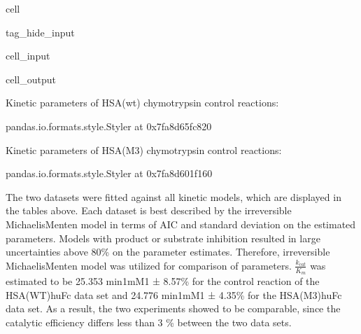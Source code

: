 \documentclass[letterpaper,12pt,english]{jupyterBook}
\begin{document}
\begin{sphinxuseclass}{cell}
\begin{sphinxuseclass}{tag_hide_input}
\begin{sphinxVerbatimInput}
\begin{sphinxuseclass}{cell_input}
\end{sphinxuseclass}\end{sphinxVerbatimInput}
\begin{sphinxVerbatimOutput}

\begin{sphinxuseclass}{cell_output}
\begin{sphinxVerbatim}[commandchars=\\\{\}]
Kinetic parameters of HSA(wt) chymotrypsin control reactions:
\end{sphinxVerbatim}

\begin{sphinxVerbatim}[commandchars=\\\{\}]
\PYGZlt{}pandas.io.formats.style.Styler at 0x7fa8d65fc820\PYGZgt{}
\end{sphinxVerbatim}

\begin{sphinxVerbatim}[commandchars=\\\{\}]
Kinetic parameters of HSA(M3) chymotrypsin control reactions:
\end{sphinxVerbatim}

\begin{sphinxVerbatim}[commandchars=\\\{\}]
\PYGZlt{}pandas.io.formats.style.Styler at 0x7fa8d601f160\PYGZgt{}
\end{sphinxVerbatim}

\noindent{}

\end{sphinxuseclass}\end{sphinxVerbatimOutput}

\end{sphinxuseclass}
\end{sphinxuseclass}
\sphinxAtStartPar
{}

\sphinxAtStartPar
The two datasets were fitted against all kinetic models, which are displayed in the tables above.
Each dataset is best described by the irreversible Michaelis\sphinxhyphen{}Menten model in terms of AIC and standard deviation on the estimated parameters. Models with product or substrate inhibition resulted in large uncertainties above 80\% on the parameter estimates. Therefore, irreversible Michaelis\sphinxhyphen{}Menten model was utilized for comparison of parameters. \(\frac{k_{cat}}{K_{m}}\) was estimated to be 25.353 min\sphinxhyphen{}1mM\sphinxhyphen{}1 ± 8.57\% for the control reaction of the HSA(WT)\sphinxhyphen{}huFc data set and 24.776 min\sphinxhyphen{}1mM\sphinxhyphen{}1 ± 4.35\% for the HSA(M3)\sphinxhyphen{}huFc data set. As a result, the two experiments showed to be comparable, since the catalytic efficiency differs less than 3 \% between the two data sets.
\end{document}
